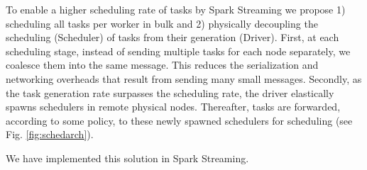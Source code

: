 To enable a higher scheduling rate of tasks by Spark Streaming we propose 1) scheduling all tasks per worker in bulk and 2) physically decoupling the scheduling (Scheduler) of tasks from their generation (Driver).
First, at each scheduling stage, instead of sending multiple tasks for each node separately, we coalesce them into the same message. This reduces the serialization and networking overheads that result from sending many small messages.
Secondly, as the task generation rate surpasses the scheduling rate, the driver elastically spawns schedulers in remote physical nodes. Thereafter, tasks are forwarded, according to some policy, to these newly spawned schedulers for scheduling (see Fig. \ref{fig:schedarch}). 

We have implemented this solution in Spark Streaming.
